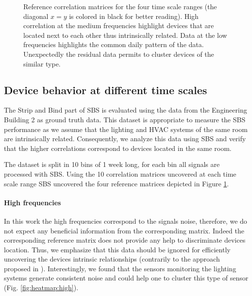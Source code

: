 \begin{figure}[t!]
\caption{Reference correlation matrices for the four time scale ranges (the diagonal $x=y$ is colored in black for better reading). High correlation at the medium frequencies highlight devices that are located next to each other thus intrinsically related. Data at the low frequencies highlights the common daily pattern of the data. Unexpectedly the residual data permits to cluster devices of the similar type.}
\label{fig:heatmap}
\end{figure}

\subsection{Device behavior at different time scales}
The Strip and Bind part of SBS is evaluated using the data from the Engineering Building 2 as ground truth data.
This dataset is appropriate to measure the SBS performance as we assume that the lighting and HVAC systems of the same room are intrinsically related.
Consequently, we analyze this data using SBS and verify that the higher correlations correspond to devices located in the same room.

The dataset is split in 10 bins of 1 week long, for each bin all signals are processed with SBS.
Using the 10 correlation matrices uncovered at each time scale range SBS uncovered the four reference matrices depicted in Figure \ref{fig:heatmap}.

\paragraph{High frequencies}
In this work the high frequencies correspond to the signals noise, therefore, we do not expect any beneficial information from the corresponding matrix.
Indeed the corresponding reference matrix does not provide any help to discriminate devices location.
Thus, we emphasize that this data should be ignored for efficiently uncovering the devices intrinsic relationships (contrarily to the approach proposed in \cite{romain:iotapp12}).
Interestingly, we found that the sensors monitoring the lighting systems generate consistent noise and could help one to cluster this type of sensor (Fig. \ref{fig:heatmap:high}).
  
